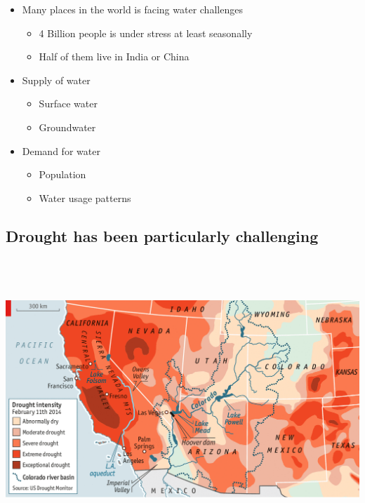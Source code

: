 \documentclass[]{article}
\providecommand{\tightlist}{%
  \setlength{\itemsep}{0pt}\setlength{\parskip}{0pt}}
\begin{document}
\begin{itemize}
\tightlist
\item
  Many places in the world is facing water challenges

  \begin{itemize}
  \tightlist
  \item
    4 Billion people is under stress at least seasonally
  \item
    Half of them live in India or China
  \end{itemize}
\item
  Supply of water

  \begin{itemize}
  \tightlist
  \item
    Surface water
  \item
    Groundwater
  \end{itemize}
\item
  Demand for water

  \begin{itemize}
  \tightlist
  \item
    Population
  \item
    Water usage patterns
  \end{itemize}
\end{itemize}

\hypertarget{drought-has-been-particularly-challenging}{%
\subsection{Drought has been particularly
challenging}\label{drought-has-been-particularly-challenging}}

\includegraphics[width=\textwidth,height=4.16667in]{figures/m10_drought_in_the_west.png}
\end{document}
